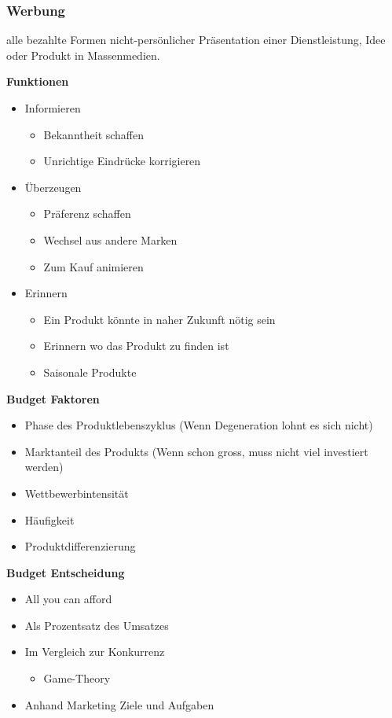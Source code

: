 \subsubsection{Werbung}
\begin{definition}
    [Werbung] alle bezahlte Formen nicht-persönlicher Präsentation einer Dienstleistung, Idee oder Produkt in Massenmedien.
\end{definition}

\textbf{Funktionen}
\begin{itemize}
    \item Informieren
    \begin{itemize}
        \item Bekanntheit schaffen
        \item Unrichtige Eindrücke korrigieren
    \end{itemize}
    \item Überzeugen
    \begin{itemize}
        \item Präferenz schaffen
        \item Wechsel aus andere Marken
        \item Zum Kauf animieren
    \end{itemize}
    \item Erinnern
    \begin{itemize}
        \item Ein Produkt könnte in naher Zukunft nötig sein
        \item Erinnern wo das Produkt zu finden ist
        \item Saisonale Produkte 
    \end{itemize}
\end{itemize}

\textbf{Budget Faktoren}
\begin{itemize}
    \item Phase des Produktlebenszyklus (Wenn Degeneration lohnt es sich nicht)
    \item Marktanteil des Produkts (Wenn schon gross, muss nicht viel investiert werden)
    \item Wettbewerbintensität
    \item Häufigkeit
    \item Produktdifferenzierung 
\end{itemize}
\pagebreak
\textbf{Budget Entscheidung}
\begin{itemize}
    \item All you can afford
    \item Als Prozentsatz des Umsatzes
    \item Im Vergleich zur Konkurrenz
    \begin{itemize}
        \item Game-Theory
    \end{itemize}
    \item Anhand Marketing Ziele und Aufgaben
\end{itemize}

